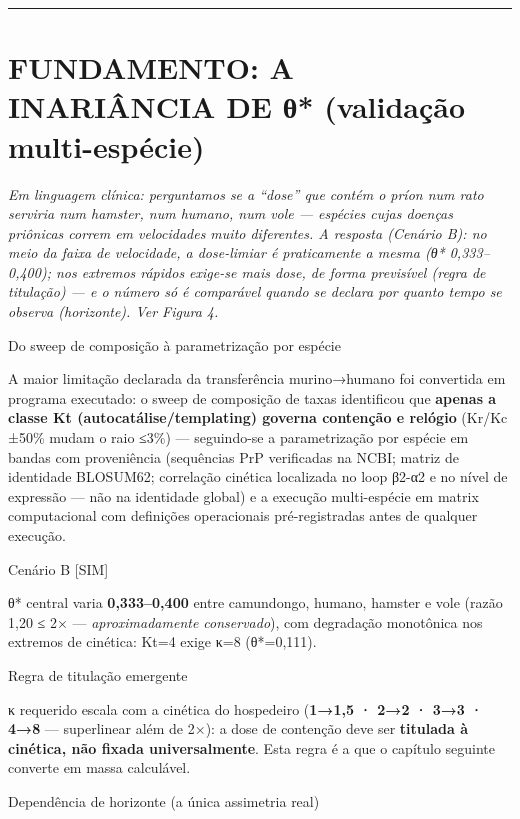 \documentclass[12pt,a4paper,oneside]{report}
\begin{document}
\begin{center}\rule{0.5\linewidth}{0.5pt}\end{center}

\hypertarget{fundamento-a-inariuxe2ncia-de-ux3b8-validauxe7uxe3o-multi-espuxe9cie}{%
\chapter{FUNDAMENTO: A INARIÂNCIA DE θ* (validação
multi-espécie)}\label{fundamento-a-inariuxe2ncia-de-ux3b8-validauxe7uxe3o-multi-espuxe9cie}}

\emph{Em linguagem clínica: perguntamos se a ``dose'' que contém o príon
num rato serviria num hamster, num humano, num vole --- espécies cujas
doenças priônicas correm em velocidades muito diferentes. A resposta
(Cenário B): no meio da faixa de velocidade, a dose-limiar é
praticamente a mesma (θ* 0,333--0,400); nos extremos rápidos exige-se
mais dose, de forma previsível (regra de titulação) --- e o número só é
comparável quando se declara por quanto tempo se observa (horizonte).
Ver Figura 4.}

Do sweep de composição à parametrização por espécie

A maior limitação declarada da transferência murino→humano foi
convertida em programa executado: o sweep de composição de taxas
identificou que \textbf{apenas a classe Kt (autocatálise/templating)
governa contenção e relógio} (Kr/Kc ±50\% mudam o raio ≤3\%) ---
seguindo-se a parametrização por espécie em bandas com proveniência
(sequências PrP verificadas na NCBI; matriz de identidade BLOSUM62;
correlação cinética localizada no loop β2-α2 e no nível de expressão ---
não na identidade global) e a execução multi-espécie em matrix
computacional com definições operacionais pré-registradas antes de
qualquer execução.

Cenário B {[}SIM{]}

θ* central varia \textbf{0,333--0,400} entre camundongo, humano, hamster
e vole (razão 1,20 ≤ 2× --- \emph{aproximadamente conservado}), com
degradação monotônica nos extremos de cinética: Kt=4 exige κ=8
(θ*=0,111).

Regra de titulação emergente

κ requerido escala com a cinética do hospedeiro (\textbf{1→1,5 · 2→2 ·
3→3 · 4→8} --- superlinear além de 2×): a dose de contenção deve ser
\textbf{titulada à cinética, não fixada universalmente}. Esta regra é a
que o capítulo seguinte converte em massa calculável.

Dependência de horizonte (a única assimetria real)
\end{document}
